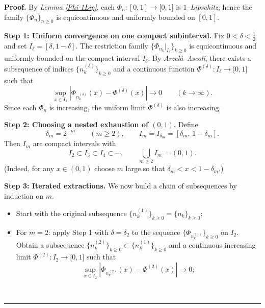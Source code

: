 \documentclass[onecolumn]{article}
\newenvironment{proof}[1][Proof]{\noindent\textbf{#1.} }{\ \rule{0.5em}{0.5em}}
\begin{document}
\begin{proof}
By \textit{Lemma \ref{Phi-1Lip}}, each $\Phi _{n}:[0,1]\rightarrow \lbrack
0,1]$ is $1$\textit{--Lipschitz}, hence the family $\{\Phi _{n}\}_{n\geq 0}$
is equicontinuous and uniformly bounded on $[0,1]$.

\smallskip \noindent \textbf{Step 1: Uniform convergence on one compact
subinterval.} Fix $0<\delta <\tfrac{1}{2}$ and set $I_{\delta }=[\delta
,1-\delta ]$. The restriction family $\{\Phi _{n_{k}}|_{I_{\delta
}}\}_{k\geq 0}$ is equicontinuous and uniformly bounded on the compact
interval $I_{\delta }$. By \textit{Arzel\`{a}--Ascoli}, there exists a
subsequence of indices $\{n_{k}^{(\delta )}\}_{k\geq 0}$ and a continuous
function $\Phi ^{(\delta )}:I_{\delta }\rightarrow \lbrack 0,1]$ such that 
\begin{equation}
\sup_{x\in I_{\delta }}\left\vert \Phi _{n_{k}^{(\delta )}}(x)-\Phi
^{(\delta )}(x)\right\vert \rightarrow 0\qquad (k\rightarrow \infty ).
\label{875}
\end{equation}%
Since each $\Phi _{n}$ is increasing, the uniform limit $\Phi ^{(\delta )}$
is also increasing.

\smallskip \noindent \textbf{Step 2: Choosing a nested exhaustion of $(0,1)$.%
} Define 
\begin{equation}
\delta _{m}=2^{-m}\qquad (m\geq 2),\qquad I_{m}=I_{\delta _{m}}=[\delta
_{m},\,1-\delta _{m}].  \label{875a}
\end{equation}%
Then $I_{m}$ are compact intervals with 
\begin{equation}
I_{2}\subset I_{3}\subset I_{4}\subset \cdots ,\qquad \bigcup_{m\geq
2}I_{m}=(0,1).  \label{875b}
\end{equation}%
(Indeed, for any $x\in (0,1)$ choose $m$ large so that $\delta
_{m}<x<1-\delta _{m}$.)

\smallskip \noindent \textbf{Step 3: Iterated extractions.} We now build a
chain of subsequences by induction on $m$.

\begin{itemize}
\item Start with the original subsequence $\{n_{k}^{(1)}\}_{k\geq
0}=\{n_{k}\}_{k\geq 0}$;

\item For $m=2$: apply Step 1 with $\delta =\delta _{2}$ to the sequence $%
\{\Phi _{n_{k}^{(1)}}\}_{k\geq 0}$ on $I_{2}$. Obtain a subsequence $%
\{n_{k}^{(2)}\}_{k\geq 0}\subset \{n_{k}^{(1)}\}_{k\geq 0}$ and a continuous
increasing limit $\Phi ^{(2)}:I_{2}\rightarrow \lbrack 0,1]$ such that 
\begin{equation}
\sup_{x\in I_{2}}\left\vert \Phi _{n_{k}^{(2)}}(x)-\Phi ^{(2)}(x)\right\vert
\rightarrow 0;  \label{875c}
\end{equation}


\end{itemize}
\end{proof}
\end{document}
